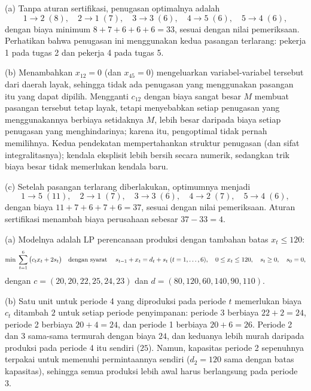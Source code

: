 
(a) Tanpa aturan sertifikasi, penugasan optimalnya adalah
\[
1 \to 2 \;(8), \quad 2 \to 1 \;(7), \quad 3 \to 3 \;(6), \quad 4 \to 5 \;(6), \quad 5 \to 4 \;(6),
\]
dengan biaya minimum $8 + 7 + 6 + 6 + 6 = 33$, sesuai dengan nilai pemeriksaan. Perhatikan bahwa penugasan ini menggunakan kedua pasangan terlarang: pekerja 1 pada tugas 2 dan pekerja 4 pada tugas 5.

(b) Menambahkan $x_{12} = 0$ (dan $x_{45} = 0$) mengeluarkan variabel-variabel tersebut dari daerah layak, sehingga tidak ada penugasan yang menggunakan pasangan itu yang dapat dipilih. Mengganti $c_{12}$ dengan biaya sangat besar $M$ membuat pasangan tersebut tetap layak, tetapi menyebabkan setiap penugasan yang menggunakannya berbiaya setidaknya $M$, lebih besar daripada biaya setiap penugasan yang menghindarinya; karena itu, pengoptimal tidak pernah memilihnya. Kedua pendekatan mempertahankan struktur penugasan (dan sifat integralitasnya); kendala eksplisit lebih bersih secara numerik, sedangkan trik biaya besar tidak memerlukan kendala baru.

(c) Setelah pasangan terlarang diberlakukan, optimumnya menjadi
\[
1 \to 5 \;(11), \quad 2 \to 1 \;(7), \quad 3 \to 3 \;(6), \quad 4 \to 2 \;(7), \quad 5 \to 4 \;(6),
\]
dengan biaya $11 + 7 + 6 + 7 + 6 = 37$, sesuai dengan nilai pemeriksaan. Aturan sertifikasi menambah biaya perusahaan sebesar $37 - 33 = 4$.


(a) Modelnya adalah LP perencanaan produksi dengan tambahan batas $x_t \leq 120$:
\[
\min \; \sum_{t=1}^{6} \big(c_t x_t + 2 s_t\big) \quad \mbox{dengan syarat}\quad \; s_{t-1} + x_t = d_t + s_t \; (t = 1, \dots, 6), \quad 0 \leq x_t \leq 120, \quad s_t \geq 0, \quad s_0 = 0,
\]
dengan $c = (20, 20, 22, 25, 24, 23)$ dan $d = (80, 120, 60, 140, 90, 110)$.

(b) Satu unit untuk periode 4 yang diproduksi pada periode $t$ memerlukan biaya $c_t$ ditambah $2$ untuk setiap periode penyimpanan: periode 3 berbiaya $22 + 2 = 24$, periode 2 berbiaya $20 + 4 = 24$, dan periode 1 berbiaya $20 + 6 = 26$. Periode 2 dan 3 sama-sama termurah dengan biaya $24$, dan keduanya lebih murah daripada produksi pada periode 4 itu sendiri ($25$). Namun, kapasitas periode 2 sepenuhnya terpakai untuk memenuhi permintaannya sendiri ($d_2 = 120$ sama dengan batas kapasitas), sehingga semua produksi lebih awal harus berlangsung pada periode 3.

